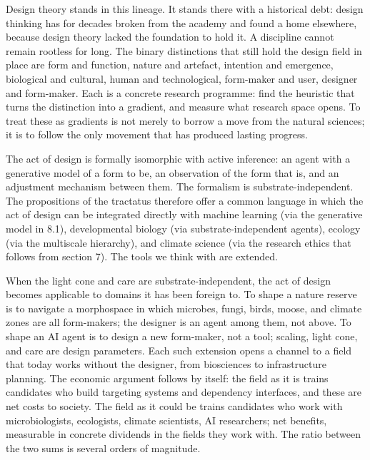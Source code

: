 \begin{widebody}
{Design theory stands in this lineage. It stands there with a historical debt: design thinking has for decades broken from the academy and found a home elsewhere, because design theory lacked the foundation to hold it. A discipline cannot remain rootless for long. The binary distinctions that still hold the design field in place are form and function, nature and artefact, intention and emergence, biological and cultural, human and technological, form-maker and user, designer and form-maker. Each is a concrete research programme: find the heuristic that turns the distinction into a gradient, and measure what research space opens. To treat these as gradients is not merely to borrow a move from the natural sciences; it is to follow the only movement that has produced lasting progress.

The act of design is formally isomorphic with active inference: an agent with a generative model of a form to be, an observation of the form that is, and an adjustment mechanism between them. The formalism is substrate-independent. The propositions of the tractatus therefore offer a common language in which the act of design can be integrated directly with machine learning (via the generative model in 8.1), developmental biology (via substrate-independent agents), ecology (via the multiscale hierarchy), and climate science (via the research ethics that follows from section 7). The tools we think with are extended.

When the light cone and care are substrate-independent, the act of design becomes applicable to domains it has been foreign to. To shape a nature reserve is to navigate a morphospace in which microbes, fungi, birds, moose, and climate zones are all form-makers; the designer is an agent among them, not above. To shape an AI agent is to design a new form-maker, not a tool; scaling, light cone, and care are design parameters. Each such extension opens a channel to a field that today works without the designer, from biosciences to infrastructure planning. The economic argument follows by itself: the field as it is trains candidates who build targeting systems and dependency interfaces, and these are net costs to society. The field as it could be trains candidates who work with microbiologists, ecologists, climate scientists, AI researchers; net benefits, measurable in concrete dividends in the fields they work with. The ratio between the two sums is several orders of magnitude.

}
\end{widebody}
